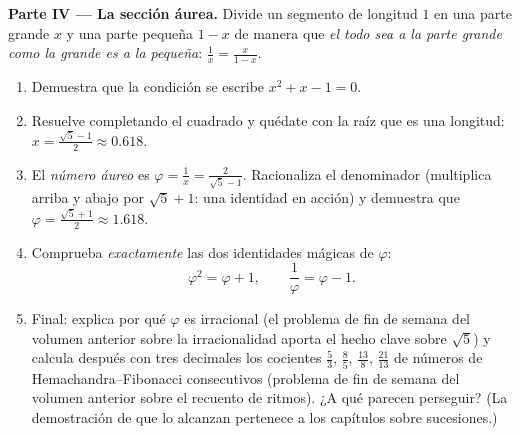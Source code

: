 \begin{problem}[{Problema de fin de semana --- problemas de suma y
producto, completar el cuadrado tal como lo dibujaba al-Juarismi y la
ecuación $x^2 = x + 1$}]
\medskip
\noindent\textbf{Parte IV --- La sección áurea.}
Divide un segmento de longitud $1$ en una parte grande $x$ y una parte
pequeña $1 - x$ de manera que \emph{el todo sea a la parte grande como la
grande es a la pequeña}: $\frac{1}{x} = \frac{x}{1 - x}$.
\begin{enumerate}[resume]
  \item Demuestra que la condición se escribe $x^2 + x - 1 = 0$.
  \item Resuelve completando el cuadrado y quédate con la raíz que es una
        longitud: $x = \frac{\sqrt5 - 1}{2} \approx 0.618$.
  \item El \emph{número áureo} es $\varphi = \frac1x =
        \frac{2}{\sqrt5 - 1}$. Racionaliza el denominador (multiplica
        arriba y abajo por $\sqrt5 + 1$: una identidad en acción) y
        demuestra que $\varphi = \frac{\sqrt5 + 1}{2} \approx 1.618$.
  \item Comprueba \emph{exactamente} las dos identidades mágicas de
        $\varphi$:
        \[
        \varphi^2 = \varphi + 1,
        \qquad
        \frac{1}{\varphi} = \varphi - 1 .
        \]
  \item Final: explica por qué $\varphi$ es irracional (el problema de fin
        de semana del volumen anterior sobre la irracionalidad aporta el
        hecho clave sobre $\sqrt5$) y calcula después con tres decimales
        los cocientes $\frac53$, $\frac85$, $\frac{13}{8}$,
        $\frac{21}{13}$ de números de Hemachandra--Fibonacci consecutivos
        (problema de fin de semana del volumen anterior sobre el recuento
        de ritmos). ¿A qué parecen perseguir? (La demostración de que lo
        alcanzan pertenece a los capítulos sobre sucesiones.)
\end{enumerate}
\end{problem}
